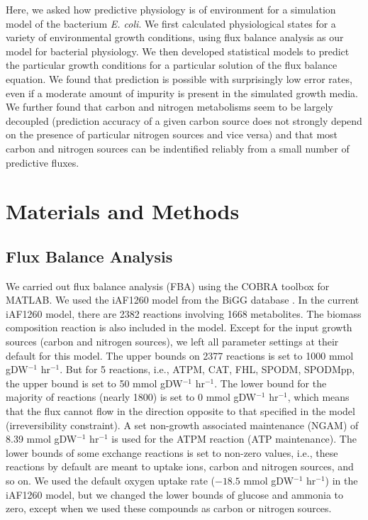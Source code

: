 \documentclass[12pt]{article}
\begin{document}
Here, we asked how predictive physiology is of environment for a simulation model of the bacterium \emph{E. coli}. We first calculated physiological states for a variety of environmental growth conditions, using flux balance analysis as our model for bacterial physiology. We then developed statistical models to predict the particular growth conditions for a particular solution of the flux balance equation. We found that prediction is possible with surprisingly low error rates, even if a moderate amount of impurity is present in the simulated growth media. We further found that carbon and nitrogen metabolisms seem to be largely decoupled (prediction accuracy of a given carbon source does not strongly depend on the presence of particular nitrogen sources and vice versa) and that most carbon and nitrogen sources can be indentified reliably from a small number of predictive fluxes.


\section{Materials and Methods}

\subsection{Flux Balance Analysis} 

We carried out flux balance analysis (FBA) using the COBRA toolbox \cite{Schellenbergeretal2011} for MATLAB. 
We used the iAF1260 model from the BiGG database \cite{Schellenbergeretal2010}. In the current iAF1260 model, there are 2382 reactions involving 1668 metabolites. The biomass composition reaction is also included in the model. Except for the input growth sources (carbon and nitrogen sources), we left all parameter settings at their default for this model. The upper bounds on 2377 reactions is set to 1000  mmol gDW$^{-1}$ hr$^{-1}$. But for 5 reactions, i.e., ATPM, CAT, FHL, SPODM, SPODMpp, the upper bound is set to 50 mmol gDW$^{-1}$ hr$^{-1}$. The lower bound for the majority of reactions (nearly 1800) is set to 0 mmol gDW$^{-1}$ hr$^{-1}$, which means that the flux cannot flow in the direction opposite to that specified in the model (irreversibility constraint). A set non-growth associated maintenance (NGAM) of 8.39  mmol gDW$^{-1}$ hr$^{-1}$ is used for the ATPM reaction (ATP maintenance). The lower bounds of some exchange reactions is set to non-zero values, i.e., these reactions by default are meant to uptake ions, carbon and nitrogen sources, and so on. We used the default oxygen uptake rate ($-18.5$ mmol gDW$^{-1}$ hr$^{-1}$) in the iAF1260 model, but we changed the lower bounds of glucose and ammonia to zero, except when we used these compounds as carbon or nitrogen sources.
\end{document}
